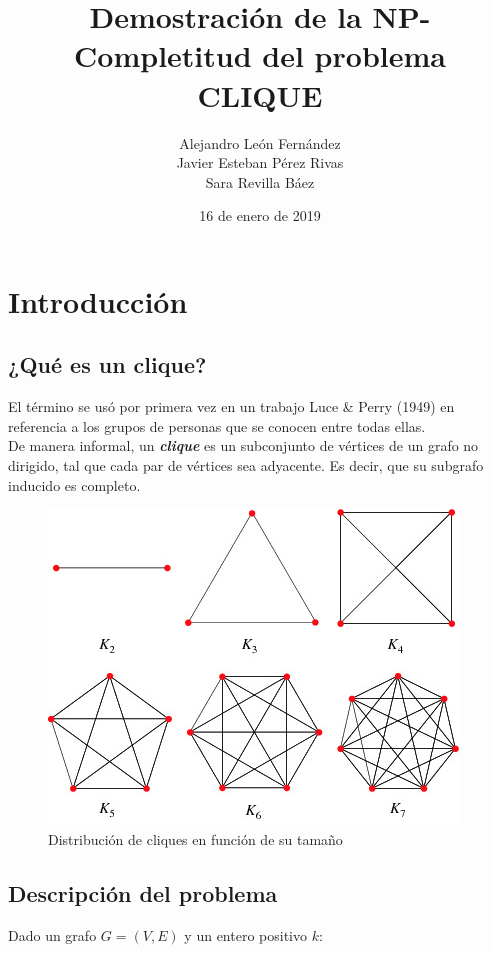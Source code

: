 \documentclass{article}
\title{Demostración de la NP-Completitud del problema CLIQUE}
\author{ Alejandro León Fernández \\
    Javier Esteban Pérez Rivas \\
    Sara Revilla Báez}
\date{16 de enero de 2019}
\begin{document}
\maketitle

\newpage

\tableofcontents

\newpage

\section{Introducción}

\subsection{¿Qué es un clique?}
El término se usó por primera vez en un trabajo Luce \& Perry (1949) en referencia a los grupos de personas que se conocen entre todas ellas. \\

De manera informal, un \textit{\textbf{clique}} es un subconjunto de vértices de un grafo no dirigido, tal que cada par de vértices sea adyacente. Es decir, que su subgrafo inducido es completo. \\

\begin{figure}[h!]
\centering
\includegraphics[width=0.8\linewidth]{img/complete_graphs.jpg}
\caption{Distribución de cliques en función de su tamaño}
\end{figure}
\subsection{Descripción del problema}
Dado un grafo $G = (V, E)$ y un entero positivo $k$:\\
\end{document}
